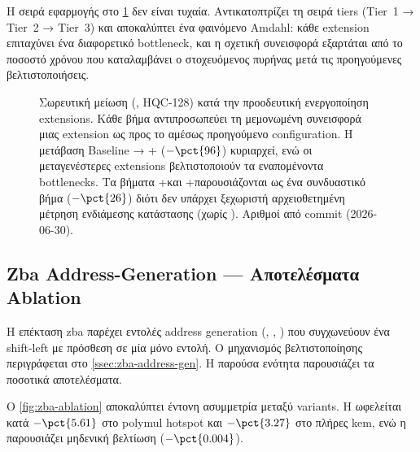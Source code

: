 Η σειρά εφαρμογής στο \cref{fig:waterfall-ablation} δεν είναι τυχαία.
Αντικατοπτρίζει τη σειρά tiers (Tier~1 → Tier~2 → Tier~3) και
αποκαλύπτει ένα φαινόμενο Amdahl: κάθε extension επιταχύνει ένα
διαφορετικό bottleneck, και η σχετική συνεισφορά εξαρτάται από το ποσοστό
χρόνου που καταλαμβάνει ο στοχευόμενος πυρήνας μετά τις προηγούμενες
βελτιστοποιήσεις.

\begin{figure}[htbp]
  \centering
  
  \caption{Σωρευτική μείωση \instret (\Decaps, HQC-128) κατά την
    προοδευτική ενεργοποίηση extensions. Κάθε βήμα αντιπροσωπεύει
    τη μεμονωμένη συνεισφορά μιας extension ως προς το αμέσως
    προηγούμενο configuration. Η μετάβαση Baseline → +\Zbc
    ($-\pct{96}$) κυριαρχεί, ενώ οι μεταγενέστερες extensions
    βελτιστοποιούν τα εναπομένοντα bottlenecks. Τα βήματα
    +\Zvbc και +\Zvbb παρουσιάζονται ως ένα συνδυαστικό βήμα
    ($-\pct{26}$) διότι δεν υπάρχει ξεχωριστή αρχειοθετημένη
    μέτρηση ενδιάμεσης κατάστασης (\Zvbc χωρίς \Zvbb).
    Αριθμοί από commit  (2026-06-30).}
  \label{fig:waterfall-ablation}
\end{figure}

\subsection{Zba Address-Generation — Αποτελέσματα Ablation}
\label{ssec:zba-ablation}


Η επέκταση \gls{zba} παρέχει εντολές address generation (,
, ) που συγχωνεύουν ένα shift-left με πρόσθεση
σε μία μόνο εντολή. Ο μηχανισμός βελτιστοποίησης περιγράφεται στο
\cref{ssec:zba-address-gen}. Η παρούσα ενότητα παρουσιάζει τα ποσοτικά
αποτελέσματα.

Ο \cref{fig:zba-ablation} αποκαλύπτει έντονη ασυμμετρία μεταξύ variants.
Η  ωφελείται κατά $-\pct{5.61}$ στο polymul hotspot
και $-\pct{3.27}$ στο πλήρες \gls{kem}, ενώ η  παρουσιάζει
μηδενική βελτίωση ($-\pct{0.004}$).

